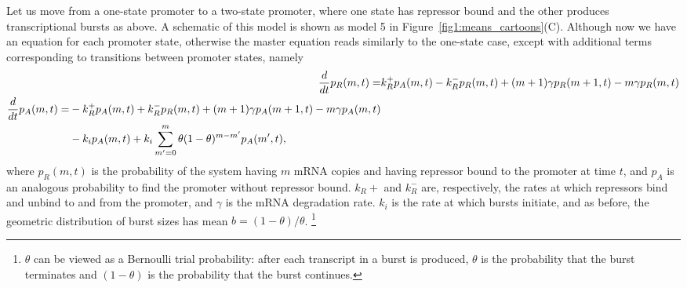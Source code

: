 Let us move from a one-state promoter to a two-state promoter, where one state
has repressor bound and the other produces transcriptional bursts as above.
A schematic of this model is shown as model 5 in
Figure~\ref{fig1:means_cartoons}(C). Although now we have an equation for each
promoter state, otherwise the master equation reads similarly to the one-state
case, except with additional terms corresponding to transitions between promoter
states, namely
\begin{align}
{d\over dt}p_R(m,t) =& 
k_R^+ p_A(m,t) - k_R^- p_R(m,t)
        + (m+1)\gamma p_R(m+1,t) - m\gamma p_R(m,t)
\\
\begin{split}
{d\over dt}p_A(m,t) =& - k_R^+ p_A(m,t) + k_R^- p_R(m,t)
        + (m+1)\gamma p_A(m+1,t) - m\gamma p_A(m,t) 
\\
&- k_i p_A(m,t) + k_i \sum_{m^\prime=0}^m \theta(1-\theta)^{m-m^\prime} p_A(m^\prime,t),
\end{split}
\end{align}
where $p_R(m,t)$ is the probability of the system having $m$ mRNA copies and
having repressor bound to the promoter at time $t$, and $p_A$ is an analogous
probability to find the promoter without repressor bound. $k_R+$ and $k_R^-$
are, respectively, the rates at which repressors bind and unbind to and from the
promoter, and $\gamma$ is the mRNA degradation rate. $k_i$ is the rate at which
bursts initiate, and as before, the geometric distribution of burst sizes has
mean $b=(1-\theta)/\theta$.
\footnote{
$\theta$ can be viewed as a Bernoulli trial probability: after each transcript
in a burst is produced, $\theta$ is the probability that the burst terminates
and $(1-\theta)$ is the probability that the burst continues.
}

